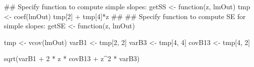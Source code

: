 \begin{Schunk}
\begin{Sinput}
 ## Specify function to compute simple slopes:
 getSS <- function(z, lmOut) {
     tmp <- coef(lmOut)
     tmp[2] + tmp[4]*z
 }
 ##
 ## Specify function to compute SE for simple slopes:
 getSE <- function(z, lmOut) {
     tmp <- vcov(lmOut)
     varB1 <- tmp[2, 2]
     varB3 <- tmp[4, 4]
     covB13 <- tmp[4, 2]
 
     sqrt(varB1 + 2 * z * covB13 + z^2 * varB3)
 }
\end{Sinput}
\end{Schunk}
